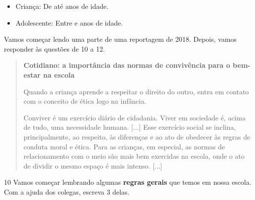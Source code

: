 \begin{itemize}
\begin{itemize}
\begin{itemize}
\begin{itemize}
{{\begin{itemize}
\item Criança: De \preencher até \preencher anos de idade. 

\item Adolescente: Entre \preencher e \preencher anos de idade. 
\end{itemize}


Vamos começar lendo uma parte de uma reportagem de 2018. Depois, vamos responder às questões de 10 a 12.

\begin{quote}
\textbf{Cotidiano: a importância das normas de convivência para o bem-estar na escola}

Quando a criança aprende a respeitar o direito do outro, entra em
contato com o conceito de ética logo na infância.

Conviver é um exercício diário de cidadania. Viver em sociedade é, acima
de tudo, uma necessidade humana. [...] Esse exercício social se inclina,
principalmente, ao respeito, às diferenças e ao ato de obedecer às
regras de conduta moral e ética. Para as crianças, em especial, as
normas de relacionamento com o meio são mais bem exercidas na escola,
onde o ato de dividir o mesmo espaço é mais intenso. [...]

\end{quote}

\num{10} Vamos começar lembrando algumas \textbf{regras gerais} que temos em
nossa escola. Com a ajuda dos colegas, escreva 3 delas.

}}
\end{itemize}
\end{itemize}
\end{itemize}
\end{itemize}
